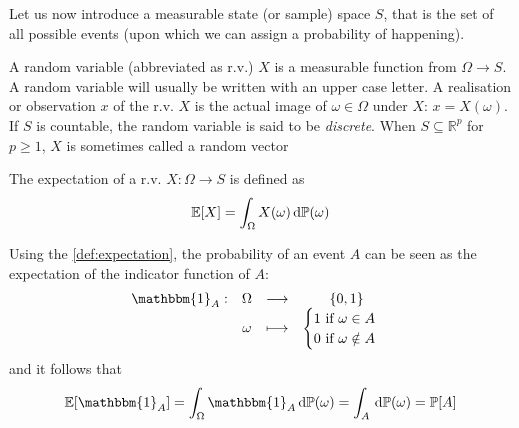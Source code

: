 \documentclass[../../Main_ManuscritThese.tex]{subfiles}
\begin{document}
Let us now introduce a measurable state (or sample) space $S$, that is the set of all possible events (upon which we can assign a probability of happening).
\begin{definition}
  \label{def:random_variable}
  A random variable (abbreviated as r.v.) $X$ is a measurable function from $\Omega \longrightarrow S$. A random variable will usually be written with an upper case letter. A realisation or observation $x$ of the r.v. $X$ is the actual image of $\omega\in\Omega$ under $X$: $x = X(\omega)$. If $S$ is countable, the random variable is said to be \emph{discrete}. When $S\subseteq \mathbb{R}^p$ for $p\geq 1$, $X$ is sometimes called a random vector
  
  \label{def:expectation}
  The expectation of a r.v. $X:\Omega \rightarrow S$ is defined as
  \begin{equation}
    \mathbb{E}[X] = \int_{\Omega} X(\omega) \,\mathrm{d}\mathbb{P}(\omega)
  \end{equation}
\end{definition}

  Using the \cref{def:expectation}, the probability of an event $A$ can be seen as the expectation of the indicator function of $A$:
  \begin{equation}
    \begin{array}{cccc}
      \mathbbm{1}_{A}:& \Omega& \longrightarrow& \{0,1\} \\
                      & \omega& \longmapsto & \begin{cases}
                        1\text{ if } \omega \in A \\
                        0 \text{ if } \omega \notin A
                                              \end{cases}
    \end{array}
  \end{equation}
  and it follows that
  \begin{equation}
    \Ex[\mathbbm{1}_A] = \int_{\Omega} \mathbbm{1}_A \, \mathrm{d}\Prob(\omega)= \int_{A} \, \mathrm{d}\Prob(\omega) = \Prob[A]
  \end{equation}
\end{document}
